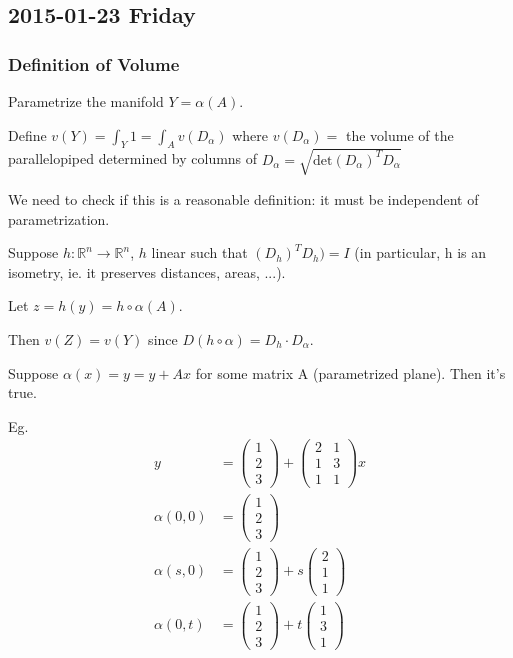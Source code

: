
\subsection{2015-01-23 Friday}
\subsubsection{Definition of Volume}

Parametrize the manifold $Y=\alpha(A)$.

Define $v(Y)=\int_Y 1=\int_A v(D_{\alpha})$ where $v(D_{\alpha})=$ the volume of the parallelopiped determined by columns of $D_{\alpha}=\sqrt{\text{det}(D_{\alpha})^T D_{\alpha}}$

We need to check if this is a reasonable definition: it must be independent of parametrization.

Suppose $h:\mathbb{R}^n\rightarrow\mathbb{R}^n$, $h$ linear such that $(D_h)^TD_h)=I$ (in particular, h is an isometry, ie. it preserves distances, areas, ...).

Let $z=h(y)=h\circ \alpha (A)$.

Then $v(Z)=v(Y)$ since $D(h\circ \alpha )= D_h\cdot D_{\alpha}$.

Suppose $\alpha(x)=y=y+Ax$ for some matrix A (parametrized plane).  Then it's true.

Eg.  
\begin{align*}
y&= \left( \begin{array}{c}
1 \\
2 \\
3 \end{array} \right)+ \left( \begin{array}{cc}
2 & 1 \\
1 & 3 \\
1 & 1 \end{array} \right)x\\
\alpha(0,0)&=\left( \begin{array}{c}
1 \\
2 \\
3 \end{array} \right)\\
\alpha(s,0)&=\left( \begin{array}{c}
1 \\
2 \\
3 \end{array} \right)+s \left( \begin{array}{c}
2 \\
1 \\
1 \end{array} \right)\\
\alpha(0,t)&=\left( \begin{array}{c}
1 \\
2 \\
3 \end{array} \right)+t \left( \begin{array}{c}
1 \\
3 \\
1 \end{array} \right)
\end{align*}


